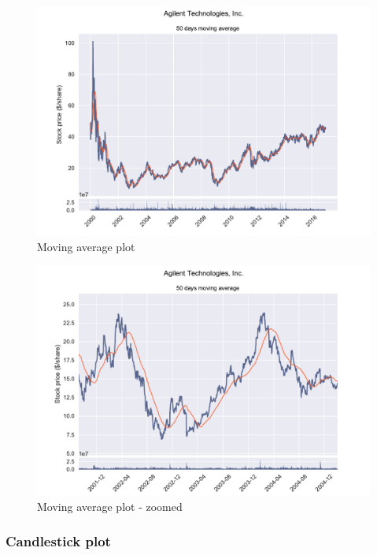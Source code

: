 \documentclass[12pt, a4paper]{article}
\begin{document}
\begin{figure}[H]
    \centering
    \includegraphics[width=\textwidth]{src/stocks/simple/movingavg}
    \caption{Moving average plot}
    \label{fig:stock_movingavg}
\end{figure}

\begin{figure}[H]
    \centering
    \includegraphics[width=\textwidth]{src/stocks/simple/movingavg_zoom}
    \caption{Moving average plot - zoomed}
    \label{fig:stock_movingavg_zoom}
\end{figure}

\subsubsection{Candlestick plot}
\end{document}
